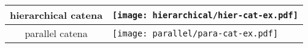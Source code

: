 \documentclass{article}
\begin{document}
\begin{table}[ht] 
   \begin{tabular}{c | l }
 \hline
 hierarchical  catena & \parbox[c]{22em}{\texttt{[image: hierarchical/hier-cat-ex.pdf]}} \\
  \hline
parallel  catena & \parbox[c]{8em}{\texttt{[image: parallel/para-cat-ex.pdf]}} \\
    \hline
  \end{tabular}
\end{table}
\end{document}
